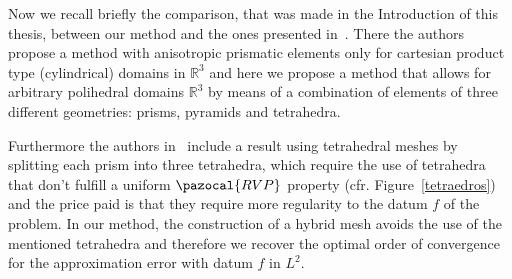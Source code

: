 Now we recall briefly the comparison, that was made in the
Introduction of this thesis, between our method and the
ones presented in~\cite{MR1866274}. There the authors propose
a method with anisotropic prismatic elements only for cartesian
product type (cylindrical) domains in $\mathbb{R}^3$ and 
here we propose
a method that allows for arbitrary polihedral domains $\mathbb{R}^3$ by
means of a combination of elements of three different geometries: prisms, pyramids
and tetrahedra.

Furthermore the authors in~\cite{MR1866274} include a result 
using tetrahedral meshes
by splitting each prism into three tetrahedra, which require
the use of tetrahedra
that don't fulfill a uniform $\pazocal{RVP}$ property 
(cfr. Figure~\ref{tetraedros})
and the price paid is that they require more regularity 
to the datum $f$ of 
the problem.
In our method, the construction of a hybrid mesh avoids 
the use of the mentioned
tetrahedra and therefore we recover the optimal order of convergence for 
the approximation error with datum $f$ in $L^2$.






